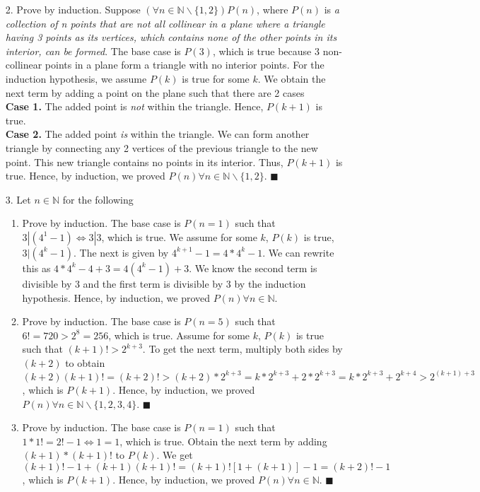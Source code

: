 \documentclass[11pt]{exam}
\begin{document}
\begin{enumerate}[leftmargin=0pt]
\item[2.] Prove by induction. Suppose $(\forall n \in \mathbb{N} \backslash \{1, 2\}) P(n)$, where $P(n)$ is \textit{a collection of n points that are not all collinear in a plane where a triangle having 3 points as its vertices, which contains none of the other points in its interior, can be formed}. The base case is $P(3)$, which is true because 3 non-collinear points in a plane form a triangle with no interior points. For the induction hypothesis, we assume $P(k)$ is true for some $k$. We obtain the next term by adding a point on the plane such that there are 2 cases \\
\textbf{Case 1.} The added point is \textit{not} within the triangle. Hence, $P(k + 1)$ is true. \\
\textbf{Case 2.} The added point \textit{is} within the triangle. We can form another triangle by connecting any 2 vertices of the previous triangle to the new point. This new triangle contains no points in its interior. Thus, $P(k + 1)$ is true. Hence, by induction, we proved $P(n) \forall n \in \mathbb{N} \backslash \{1, 2\}$. $\blacksquare$

\item[3.] Let $n \in \mathbb{N}$ for the following

\begin{enumerate}[label=(\alph*)]
    \item Prove by induction. The base case is $P(n = 1)$ such that $3 | (4^1 - 1) \Leftrightarrow 3 | 3$, which is true. We assume for some $k$, $P(k)$ is true, $3 | (4^k - 1)$. The next is given by $4^{k + 1} - 1 = 4*4^k - 1$. We can rewrite this as $4*4^k - 4 + 3 = 4(4^k - 1) + 3$. We know the second term is divisible by 3 and the first term is divisible by 3 by the induction hypothesis. Hence, by induction, we proved $P(n) \forall n \in \mathbb{N}$.
    \item Prove by induction. The base case is $P(n = 5)$ such that $6! = 720 > 2^8 = 256$, which is true. Assume for some $k$, $P(k)$ is true such that $(k + 1)! > 2^{k + 3}$. To get the next term, multiply both sides by $(k + 2)$ to obtain $(k + 2)(k + 1)! = (k + 2)! > (k + 2)*2^{k + 3} = k*2^{k + 3} + 2*2^{k + 3} = k*2^{k + 3} + 2^{k + 4} > 2^{(k + 1) + 3}$, which is $P(k + 1)$. Hence, by induction, we proved $P(n) \forall n \in \mathbb{N} \backslash \{1, 2, 3, 4\}$. $\blacksquare$
    \item Prove by induction. The base case is $P(n = 1)$ such that $1*1! = 2! - 1 \Leftrightarrow 1 = 1$, which is true. Obtain the next term by adding $(k + 1)*(k + 1)!$ to $P(k)$. We get $(k + 1)! - 1 + (k + 1)(k + 1)! = (k + 1)![1 + (k + 1)] - 1 = (k + 2)! - 1$, which is $P(k + 1)$. Hence, by induction, we proved $P(n) \forall n \in \mathbb{N}$. $\blacksquare$
\end{enumerate}

\end{enumerate}
\end{document}
